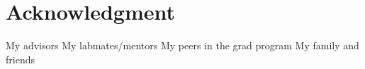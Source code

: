 \chapter*{Acknowledgment}

My advisors 
My labmates/mentors
My peers in the grad program
My family and friends


